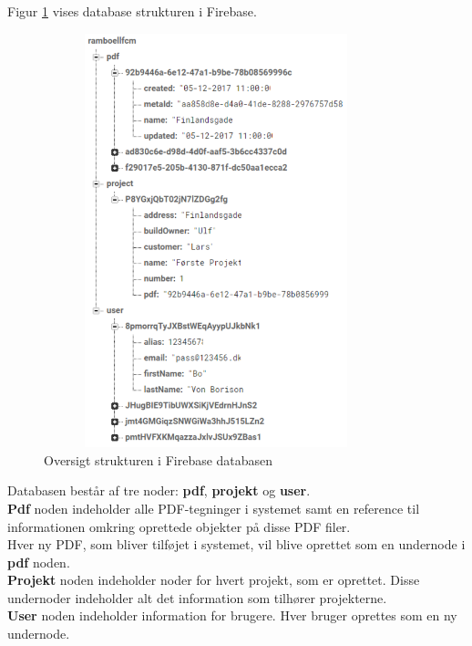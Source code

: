 Figur \ref{fig:FirebaseDB} vises database strukturen i Firebase. 
\begin{figure}[H] %
	\centering
	\includegraphics[height=12cm, width=10cm]{Design/Firebase/FirebaseDB}
	\caption{Oversigt strukturen i Firebase databasen}
	\label{fig:FirebaseDB}
\end{figure}
Databasen består af tre noder: \textbf{pdf}, \textbf{projekt} og \textbf{user}. \\
\textbf{Pdf} noden indeholder alle PDF-tegninger i systemet samt en reference til informationen omkring oprettede objekter på disse PDF filer. \\
Hver ny PDF, som bliver tilføjet i systemet, vil blive oprettet som en undernode i \textbf{pdf} noden. \\
\textbf{Projekt} noden indeholder noder for hvert projekt, som er oprettet. Disse undernoder indeholder alt det information som tilhører projekterne. \\
\textbf{User} noden indeholder information for brugere. Hver bruger oprettes som en ny undernode.

\clearpage
